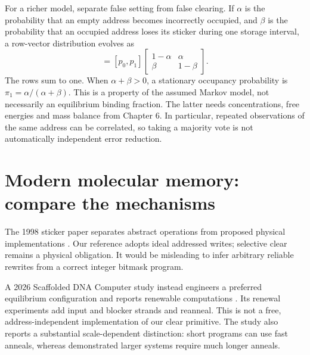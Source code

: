 
\begin{center}\end{center}

For a richer model, separate false setting from false clearing. If
$\alpha$ is the probability that an empty address becomes incorrectly
occupied, and $\beta$ is the probability that an occupied address loses
its sticker during one storage interval, a row-vector distribution evolves as
\begin{equation}
 [p_0',p_1']=[p_0,p_1]
 \begin{bmatrix}1-\alpha&\alpha\\ \beta&1-\beta\end{bmatrix}.
 \label{eq:transition}
\end{equation}
The rows sum to one. When $\alpha+\beta>0$, a stationary occupancy
probability is $\pi_1=\alpha/(\alpha+\beta)$. This is a property of the
assumed Markov model, not necessarily an equilibrium binding fraction.
The latter needs concentrations, free energies and mass balance from
Chapter 6. In particular, repeated observations of the same address can
be correlated, so taking a majority vote is not automatically independent
error reduction.

\section{Modern molecular memory: compare the mechanisms}
The 1998 sticker paper separates abstract operations from proposed physical
implementations \cite{stickers}. Our reference adopts ideal addressed writes;
selective clear remains a physical obligation. It would be misleading to
infer arbitrary reliable rewrites from a correct integer bitmask program.

A 2026 Scaffolded DNA Computer study instead engineers a preferred
equilibrium configuration and reports renewable computations \cite{sdc}.
Its renewal experiments add input and blocker strands and reanneal.
This is not a free, address-independent implementation of our clear
primitive. The study also reports a substantial scale-dependent distinction:
short programs can use fast anneals, whereas demonstrated larger systems
require much longer anneals.


